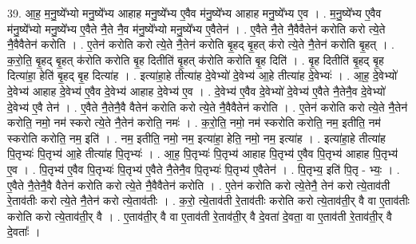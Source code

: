 \documentclass[17pt]{extarticle}
\begin{document}
39. आ॒ह॒ म॒नु॒ष्ये᳚भ्यो मनु॒ष्ये᳚भ्य आहाह मनु॒ष्ये᳚भ्य ए॒वैव म॑नु॒ष्ये᳚भ्य आहाह मनु॒ष्ये᳚भ्य ए॒व । . म॒नु॒ष्ये᳚भ्य ए॒वैव म॑नु॒ष्ये᳚भ्यो मनु॒ष्ये᳚भ्य ए॒वैते नै॒ते नै॒व म॑नु॒ष्ये᳚भ्यो मनु॒ष्ये᳚भ्य ए॒वैतेन॑ । . ए॒वैते नै॒ते नै॒वैवैतेन॑ करोति करो त्ये॒ते नै॒वैवैतेन॑ करोति । . ए॒तेन॑ करोति करो त्ये॒ते नै॒तेन॑ करोति बृ॒हद् बृ॒हत् क॑रो त्ये॒ते नै॒तेन॑ करोति बृ॒हत् । . क॒रो॒ति॒ बृ॒हद् बृ॒हत् क॑रोति करोति बृ॒ह दितीति॑ बृ॒हत् क॑रोति करोति बृ॒ह दिति॑ । . बृ॒ह दितीति॑ बृ॒हद् बृ॒ह दित्या॑हा॒ हेति॑ बृ॒हद् बृ॒ह दित्या॑ह । . इत्या॑हा॒हे तीत्या॑ह दे॒वेभ्यो॑ दे॒वेभ्य॑ आ॒हे तीत्या॑ह दे॒वेभ्यः॑ । . आ॒ह॒ दे॒वेभ्यो॑ दे॒वेभ्य॑ आहाह दे॒वेभ्य॑ ए॒वैव दे॒वेभ्य॑ आहाह दे॒वेभ्य॑ ए॒व । . दे॒वेभ्य॑ ए॒वैव दे॒वेभ्यो॑ दे॒वेभ्य॑ ए॒वैते नै॒तेनै॒व दे॒वेभ्यो॑ दे॒वेभ्य॑ ए॒वै तेन॑ । . ए॒वैते नै॒तेनै॒वै वैतेन॑ करोति करो त्ये॒ते नै॒वैवैतेन॑ करोति । . ए॒तेन॑ करोति करो त्ये॒ते नै॒तेन॑ करोति॒ नमो॒ नम॑ स्करो त्ये॒ते नै॒तेन॑ करोति॒ नमः॑ । . क॒रो॒ति॒ नमो॒ नम॑ स्करोति करोति॒ नम॒ इतीति॒ नम॑ स्करोति करोति॒ नम॒ इति॑ । . नम॒ इतीति॒ नमो॒ नम॒ इत्या॑हा॒ हेति॒ नमो॒ नम॒ इत्या॑ह । . इत्या॑हा॒हे तीत्या॑ह पि॒तृभ्यः॑ पि॒तृभ्य॑ आ॒हे तीत्या॑ह पि॒तृभ्यः॑ । . आ॒ह॒ पि॒तृभ्यः॑ पि॒तृभ्य॑ आहाह पि॒तृभ्य॑ ए॒वैव पि॒तृभ्य॑ आहाह पि॒तृभ्य॑ ए॒व । . पि॒तृभ्य॑ ए॒वैव पि॒तृभ्यः॑ पि॒तृभ्य॑ ए॒वैते नै॒तेनै॒व पि॒तृभ्यः॑ पि॒तृभ्य॑ ए॒वैतेन॑ । . पि॒तृभ्य॒ इति॑ पि॒तृ - भ्यः॒ । . ए॒वैते नै॒तेनै॒वै वैतेन॑ करोति करो त्ये॒ते नै॒वैवैतेन॑ करोति । . ए॒तेन॑ करोति करो त्ये॒तेनै॒ तेन॑ करो त्ये॒ताव॑ती रे॒ताव॑तीः करो त्ये॒ते नै॒तेन॑ करो त्ये॒ताव॑तीः । . क॒रो॒ त्ये॒ताव॑ती रे॒ताव॑तीः करोति करो त्ये॒ताव॑ती॒र् वै वा ए॒ताव॑तीः करोति करो त्ये॒ताव॑ती॒र् वै । . ए॒ताव॑ती॒र् वै वा ए॒ताव॑ती रे॒ताव॑ती॒र् वै दे॒वता॑ दे॒वता॒ वा ए॒ताव॑ती रे॒ताव॑ती॒र् वै दे॒वताः᳚ । \newline
\end{document}
